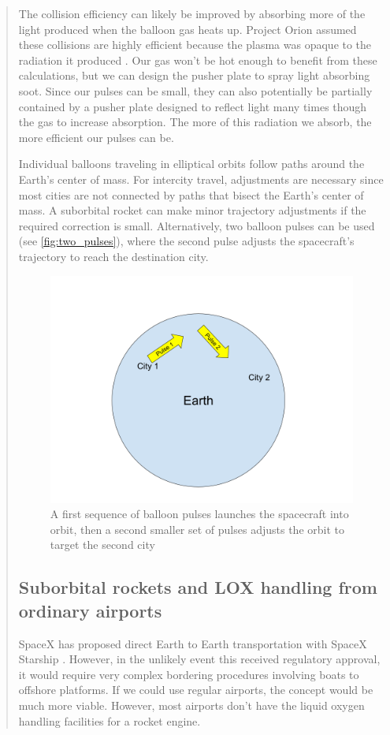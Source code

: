 \documentclass{article}
\begin{document}
\begin{quote}
The collision efficiency can likely be improved by absorbing more of the light produced when the balloon gas heats up.   Project Orion assumed these collisions are highly efficient because the plasma was opaque to the radiation it produced \cite{orion_reflections}.  Our gas won't be hot enough to benefit from these calculations, but we can design the pusher plate to spray light absorbing soot.   Since our pulses can be small, they can also potentially be partially contained by a pusher plate designed to reflect light many times though the gas to increase absorption.   The more of this radiation we absorb, the more efficient our pulses can be.  

Individual balloons traveling in elliptical orbits follow paths around the Earth’s center of mass. For intercity travel, adjustments are necessary since most cities are not connected by paths that bisect the Earth’s center of mass. A suborbital rocket can make minor trajectory adjustments if the required correction is small. Alternatively, two balloon pulses can be used (see \autoref{fig:two_pulses}), where the second pulse adjusts the spacecraft’s trajectory to reach the destination city.

\begin{figure}
    \centering
    \includegraphics[width=0.5\linewidth]{images/Two Pulses.png}
    \caption{A first sequence of balloon pulses launches the spacecraft into orbit, then a second smaller set of pulses adjusts the orbit to target the second city}
    \label{fig:two_pulses}
\end{figure}


\subsection{Suborbital rockets and LOX handling from ordinary airports}\label{sec:suborbital_airports}
SpaceX has proposed direct Earth to Earth transportation with SpaceX Starship \cite{spacex_earth_earth}.   However, in the unlikely event this received regulatory approval, it would require very complex bordering procedures involving boats to offshore platforms.   If we could use regular airports, the concept would be much more viable.    However, most airports don't have the liquid oxygen handling facilities for a rocket engine.


\end{quote}
\end{document}
